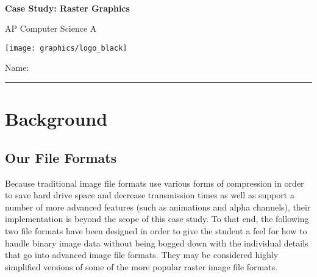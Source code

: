 

\def\CaseStudyCourse{AP Computer Science A}
\def\CaseStudyNumber{01}
\def\CaseStudyTitle{Raster Graphics}


	\begin{coverpages}
		\ \\[2cm]
		\begin{center}
			\huge
			\textbf{Case Study: \CaseStudyTitle}

			\Large
			\CaseStudyCourse
		\end{center}

		\vspace{1.5cm}

		\begin{center}
			\texttt{[image: graphics/logo\_black]}

			\vspace{2.5cm}

			\Large
			Name: \rule{11.5cm}{0.1pt}
		\end{center}
	\end{coverpages}

	\blankpage

	\thispagestyle{empty}
	\tableofcontents

	\pagebreak

  \section{Background}
    \subsection{Our File Formats}
      Because traditional image file formats use various forms of compression in order to save hard drive space and decrease transmission times as well as support a number of more advanced features (such as animations and alpha channels), their implementation is beyond the scope of this case study. To that end, the following two file formats have been designed in order to give the student a feel for how to handle binary image data without being bogged down with the individual details that go into advanced image file formats. They may be considered highly simplified versions of some of the more popular raster image file formats.
